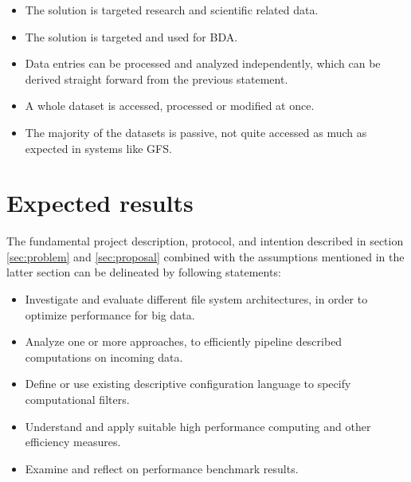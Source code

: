 \begin{itemize}
	\item The solution is targeted research and scientific related data. 
	\item The solution is targeted and used for BDA.
	\item Data entries can be processed and analyzed independently, which can be derived straight forward from the previous statement.
	\item A whole dataset is accessed, processed or modified at once.
	\item The majority of the datasets is passive, \eg not quite accessed as much as expected in systems like GFS.
\end{itemize}

\section{Expected results} \label{sec:expected-results}
The fundamental project description, protocol, and intention described in \eg section \ref{sec:problem} and \ref{sec:proposal} combined with the assumptions mentioned in the latter section can be delineated by following statements:

\begin{itemize}
	\item Investigate and evaluate different file system architectures, in order to optimize performance for big data.	
	\item Analyze one or more approaches, to efficiently pipeline described computations on incoming data.
	\item Define or use existing descriptive configuration language to specify computational filters.
	\item Understand and apply suitable high performance computing and other efficiency measures.
	\item Examine and reflect on performance benchmark results.
\end{itemize}

\section{}

